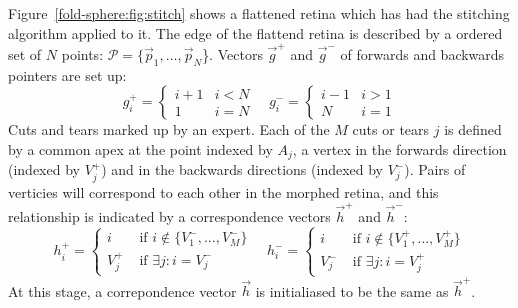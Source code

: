 \documentclass{article}
\begin{document}
Figure~\ref{fold-sphere:fig:stitch} shows a flattened
retina which has had the stitching algorithm applied to it.  The edge
of the flattend retina is described by a ordered set of $N$ points:
$\mathcal{P} = \{\vec{p}_1,\dots,\vec{p}_N$\}.  Vectors $\vec{g}^+$
and $\vec{g}^-$ of forwards and backwards pointers are set up:
\begin{displaymath}
  g^+_i = \left\{
    \begin{array}{ll}
      i+1 & i < N \\
      1   & i = N
    \end{array}\right.
  \quad
  g^-_i = \left\{
    \begin{array}{ll}
      i-1 & i > 1 \\
      N   & i = 1
    \end{array}\right.
\end{displaymath}
Cuts and tears marked up by an expert.  Each of the $M$ cuts or tears
$j$ is defined by a common apex at the point indexed by $A_j$, a
vertex in the forwards direction (indexed by $V^+_j$) and in the
backwards directions (indexed by $V^-_j$).  Pairs of verticies will
correspond to each other in the morphed retina, and this relationship
is indicated by a correspondence vectors $\vec{h}^+$ and $\vec{h}^-$:
\begin{displaymath}
  h^+_i =  \left\{
    \begin{array}{ll}
      i & \mbox{ if } i \not\in \{V^-_1,\dots, V^-_M\} \\
      V^+_j  & \mbox{ if } \exists j: i = V^-_j
    \end{array}\right.
  \quad
  h^-_i =  \left\{
    \begin{array}{ll}
      i & \mbox{ if } i \not\in \{V^+_1,\dots, V^+_M\} \\
      V^-_j  & \mbox{ if } \exists j: i = V^+_j
    \end{array}\right.
\end{displaymath}
At this stage, a correpondence vector $\vec{h}$ is initialiased to be
the same as $\vec{h}^+$.
\end{document}
